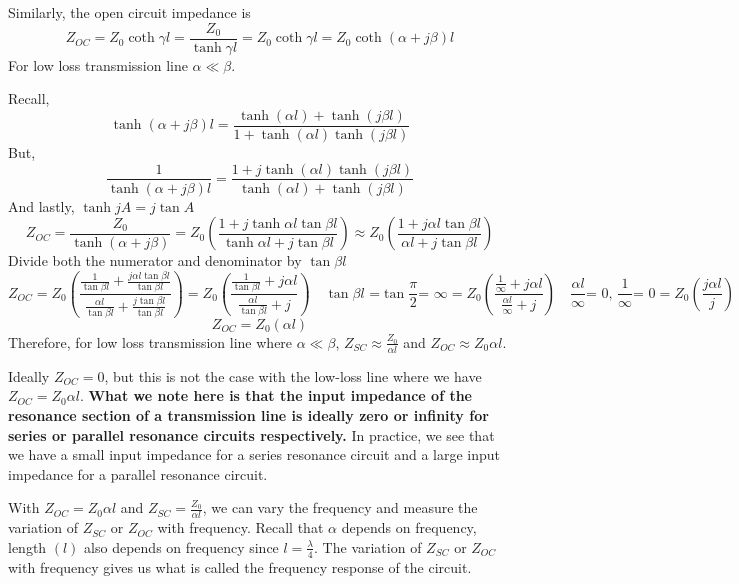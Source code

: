 Similarly, the open circuit impedance is 
\begin{dmath*}
Z_{OC}=Z_0\coth\gamma l=\frac{Z_0}{\tanh\gamma l}
=Z_0\coth\gamma l=Z_0\coth(\alpha+j\beta) l
\end{dmath*}
For low loss transmission line $ \alpha\ll\beta $.

Recall, 
\[ \tanh(\alpha+j\beta)l=\frac{\tanh (\alpha l) + \tanh (j\beta l)}{1 + \tanh (\alpha l)\tanh (j\beta l)} \]
But,
\[ \frac{1}{\tanh(\alpha+j\beta)l}=\frac{1 + j\tanh (\alpha l)\tanh (j\beta l)}{\tanh (\alpha l) + \tanh (j\beta l)} \]
And lastly, $ \tanh jA= j \tan A $
\begin{dmath*}
Z_{OC} = \frac{Z_0}{\tanh(\alpha+j\beta)}
=Z_0\left(\frac{1+j\tanh \alpha l\tan \beta l}{\tanh \alpha l+j\tan \beta l}\right)
\approx Z_0\left(\frac{1+ j \alpha l\tan \beta l}{\alpha l+j\tan \beta l}\right)
\end{dmath*}
Divide both the numerator and denominator by $ \tan \beta l $
\begin{dmath*}
Z_{OC}=Z_0\left(\frac{\frac{1}{\tan \beta l}+\frac{j \alpha l\tan \beta l}{\tan \beta l}}{\frac{\alpha l}{\tan \beta l}+\frac{j\tan \beta l}{\tan \beta l}}\right)
=Z_0\left(\frac{\frac{1}{\tan \beta l} + j \alpha l}{\frac{\alpha l}{\tan \beta l} + j}\right)\quad\tan\beta l\text{ =}\tan\frac{\pi}{2}\text{= }\infty
=Z_0\left(\frac{\frac{1}{\infty} + j \alpha l}{\frac{\alpha l}{\infty} + j}\right)\quad\frac{\alpha l}{\infty}\text{= 0, }\frac{1}{\infty}\text{= 0}
=Z_0\left(\frac{j \alpha l}{j}\right)
\end{dmath*}
\begin{equation}
Z_{OC}=Z_0(\alpha l)
\end{equation}
Therefore, for low loss transmission line where $\alpha\ll\beta$, $ Z_{SC}\approx \frac{Z_0}{\alpha l} $ and $ Z_{OC} \approx Z_0 \alpha l $. 

Ideally $ Z_{OC}=0 $, but this is not the case with the low-loss line where we have $ Z_{OC} = Z_0 \alpha l $. \textbf{What we note here is that the input impedance of the resonance section of a transmission line is ideally zero or infinity for series or parallel resonance circuits respectively.} In practice, we see that we have a small input impedance for a series resonance circuit and a large input impedance for a parallel resonance circuit.

With $ Z_{OC} = Z_0 \alpha l $ and 
$ Z_{SC}= \frac{Z_0}{\alpha l} $, we can vary the frequency and measure the variation of $ Z_{SC} $ or $ Z_{OC} $ with frequency. Recall that $ \alpha $ depends on frequency, length $(l)$ also depends on frequency since $ l=\frac{\lambda}{4} $. The variation of $ Z_{SC} $ or $ Z_{OC} $ with frequency gives us what is called the frequency response of the circuit.

